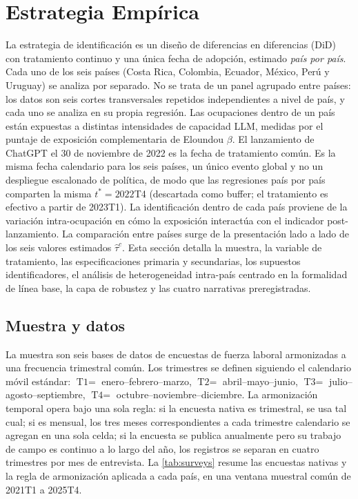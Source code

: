 \section{Estrategia Empírica}
\label{sec:method}

La estrategia de identificación es un diseño de diferencias en diferencias (DiD) con tratamiento continuo y una única fecha de adopción, estimado \emph{país por país}. Cada uno de los seis países (Costa Rica, Colombia, Ecuador, México, Perú y Uruguay) se analiza por separado. No se trata de un panel agrupado entre países: los datos son seis cortes transversales repetidos independientes a nivel de país, y cada uno se analiza en su propia regresión. Las ocupaciones dentro de un país están expuestas a distintas intensidades de capacidad LLM, medidas por el puntaje de exposición complementaria de Eloundou $\beta$. El lanzamiento de ChatGPT el 30 de noviembre de 2022 es la fecha de tratamiento común. Es la misma fecha calendario para los seis países, un único evento global y no un despliegue escalonado de política, de modo que las regresiones país por país comparten la misma $t^* = 2022$T4 (descartada como buffer; el tratamiento es efectivo a partir de 2023T1). La identificación dentro de cada país proviene de la variación intra-ocupación en cómo la exposición interactúa con el indicador post-lanzamiento. La comparación entre países surge de la presentación lado a lado de los seis valores estimados $\hat\tau^c$. Esta sección detalla la muestra, la variable de tratamiento, las especificaciones primaria y secundarias, los supuestos identificadores, el análisis de heterogeneidad intra-país centrado en la formalidad de línea base, la capa de robustez y las cuatro narrativas preregistradas.

\subsection{Muestra y datos}
\label{subsec:method_sample}

La muestra son seis bases de datos de encuestas de fuerza laboral armonizadas a una frecuencia trimestral común. Los trimestres se definen siguiendo el calendario móvil estándar: $\text{T1} = $ enero--febrero--marzo, $\text{T2} = $ abril--mayo--junio, $\text{T3} = $ julio--agosto--septiembre, $\text{T4} = $ octubre--noviembre--diciembre. La armonización temporal opera bajo una sola regla: si la encuesta nativa es trimestral, se usa tal cual; si es mensual, los tres meses correspondientes a cada trimestre calendario se agregan en una sola celda; si la encuesta se publica anualmente pero su trabajo de campo es continuo a lo largo del año, los registros se separan en cuatro trimestres por mes de entrevista. La \cref{tab:surveys} resume las encuestas nativas y la regla de armonización aplicada a cada país, en una ventana muestral común de 2021T1 a 2025T4.

